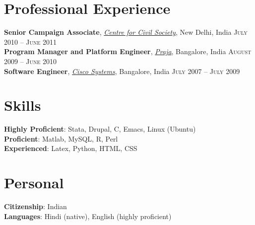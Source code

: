 \documentclass[11pt]{article}
\begin{document}
\section{Professional Experience}
\label{sec-5}
\flushleft
\textbf{Senior Campaign Associate}, \emph{\href{http://ccs.in}{Centre for Civil Society}}, New Delhi,
India \hfill \textsc{\normalsize July 2010 -- June 2011}\\
\vspace{0.6em}
\textbf{Program Manager and Platform Engineer}, \emph{\href{http://praja.in}{Praja}}, Bangalore, India
 \hfill \textsc{\normalsize August 2009 -- June 2010}\\
\vspace{0.6em}
\textbf{Software Engineer}, \emph{\href{http://www.cisco.com}{Cisco Systems}}, Bangalore, India \hfill \textsc{\normalsize July 2007 -- July 2009}\\

\section{Skills}
\label{sec-6}
\textbf{Highly Proficient}: Stata, Drupal, C, Emacs, Linux (Ubuntu) \\
\textbf{Proficient}: Matlab, MySQL, R, Perl \\
\textbf{Experienced}: Latex, Python, HTML, CSS \\
\pagebreak
\section{Personal}
\label{sec-7}
\textbf{Citizenship}: Indian \\
\textbf{Languages}: Hindi (native), English (highly proficient)\\
\end{document}
